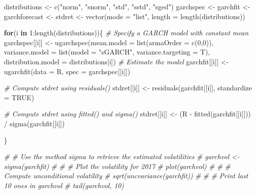 \documentclass[a4paper, twoside]{templates/ociamthesis}
\newenvironment{Shaded}{\begin{snugshade}}{\end{snugshade}}
\newcommand{\AttributeTok}[1]{\textcolor[rgb]{0.77,0.63,0.00}{#1}}
\newcommand{\CommentTok}[1]{\textcolor[rgb]{0.56,0.35,0.01}{\textit{#1}}}
\newcommand{\ConstantTok}[1]{\textcolor[rgb]{0.00,0.00,0.00}{#1}}
\newcommand{\ControlFlowTok}[1]{\textcolor[rgb]{0.13,0.29,0.53}{\textbf{#1}}}
\newcommand{\DecValTok}[1]{\textcolor[rgb]{0.00,0.00,0.81}{#1}}
\newcommand{\FunctionTok}[1]{\textcolor[rgb]{0.00,0.00,0.00}{#1}}
\newcommand{\NormalTok}[1]{#1}
\newcommand{\OtherTok}[1]{\textcolor[rgb]{0.56,0.35,0.01}{#1}}
\newcommand{\SpecialCharTok}[1]{\textcolor[rgb]{0.00,0.00,0.00}{#1}}
\newcommand{\StringTok}[1]{\textcolor[rgb]{0.31,0.60,0.02}{#1}}
\renewenvironment{Shaded}
{
  \vspace{10pt}%
  \begin{snugshade}%
}{%
  \end{snugshade}%
  \vspace{8pt}%
}
\begin{document}
\begin{Shaded}
\begin{Highlighting}[]
\NormalTok{distributions }\OtherTok{\textless{}{-}} \FunctionTok{c}\NormalTok{(}\StringTok{"norm"}\NormalTok{, }\StringTok{"snorm"}\NormalTok{, }\StringTok{"std"}\NormalTok{, }\StringTok{"sstd"}\NormalTok{, }\StringTok{"sged"}\NormalTok{)}
\NormalTok{garchspec }\OtherTok{\textless{}{-}}\NormalTok{ garchfit }\OtherTok{\textless{}{-}}\NormalTok{ garchforecast }\OtherTok{\textless{}{-}}\NormalTok{ stdret }\OtherTok{\textless{}{-}} \FunctionTok{vector}\NormalTok{(}\AttributeTok{mode =} \StringTok{"list"}\NormalTok{, }\AttributeTok{length =} \FunctionTok{length}\NormalTok{(distributions))}

\ControlFlowTok{for}\NormalTok{(i }\ControlFlowTok{in} \DecValTok{1}\SpecialCharTok{:}\FunctionTok{length}\NormalTok{(distributions))\{}
\CommentTok{\# Specify a GARCH model with constant mean}
\NormalTok{garchspec[[i]] }\OtherTok{\textless{}{-}} \FunctionTok{ugarchspec}\NormalTok{(}\AttributeTok{mean.model =} \FunctionTok{list}\NormalTok{(}\AttributeTok{armaOrder =} \FunctionTok{c}\NormalTok{(}\DecValTok{0}\NormalTok{,}\DecValTok{0}\NormalTok{)),}
                     \AttributeTok{variance.model =} \FunctionTok{list}\NormalTok{(}\AttributeTok{model =} \StringTok{"sGARCH"}\NormalTok{, }\AttributeTok{variance.targeting =}\NormalTok{ T), }
                     \AttributeTok{distribution.model =}\NormalTok{ distributions[i])}
\CommentTok{\# Estimate the model}
\NormalTok{garchfit[[i]] }\OtherTok{\textless{}{-}} \FunctionTok{ugarchfit}\NormalTok{(}\AttributeTok{data =}\NormalTok{ R, }\AttributeTok{spec =}\NormalTok{ garchspec[[i]])}

\CommentTok{\# Compute stdret using residuals()}
\NormalTok{stdret[[i]] }\OtherTok{\textless{}{-}} \FunctionTok{residuals}\NormalTok{(garchfit[[i]], }\AttributeTok{standardize =} \ConstantTok{TRUE}\NormalTok{)}

\CommentTok{\# Compute stdret using fitted() and sigma()}
\NormalTok{stdret[[i]] }\OtherTok{\textless{}{-}}\NormalTok{ (R }\SpecialCharTok{{-}} \FunctionTok{fitted}\NormalTok{(garchfit[[i]])) }\SpecialCharTok{/} \FunctionTok{sigma}\NormalTok{(garchfit[[i]]) }

\NormalTok{\}}


\CommentTok{\# \# Use the method sigma to retrieve the estimated volatilities }
\CommentTok{\# garchvol \textless{}{-} sigma(garchfit) }
\CommentTok{\# }
\CommentTok{\# \# Plot the volatility for 2017}
\CommentTok{\# plot(garchvol)}
\CommentTok{\# }
\CommentTok{\# \# Compute unconditional volatility}
\CommentTok{\# sqrt(uncvariance(garchfit))}
\CommentTok{\# }
\CommentTok{\# \# Print last 10 ones in garchvol}
\CommentTok{\# tail(garchvol, 10)}


\end{Highlighting}
\end{Shaded}
\end{document}
